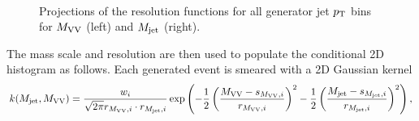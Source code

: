 \begin{figure}[h!]
\centering
{}
\\
\caption{Projections of the resolution functions for all generator jet $p_{\mathrm{T}}$ bins for $M_{\rm VV}$ (left) and $M_{\rm jet}$ (right).}
\label{fig:ResolutionProfiles}
\end{figure}
The mass scale and resolution are then used to populate the conditional 2D histogram as follows. Each generated event is smeared with a 2D Gaussian kernel 
\begin{equation}
k(M_{\rm jet},M_{\rm VV}) =\frac{w_i}{\sqrt{2\pi}r_{M_{\rm VV},i}\cdot r_{M_{\rm jet},i}} \exp \left (-\frac{1}{2} \left ( \frac{M_{\rm VV}-s_{M_{\rm VV},i}}{r_{M_{\rm VV},i}} \right)^2 -\frac{1}{2} \left ( \frac{M_{\rm jet}-s_{M_{\rm jet},i}}{r_{M_{\rm jet},i}} \right)^2 \right ),   
\end{equation}
